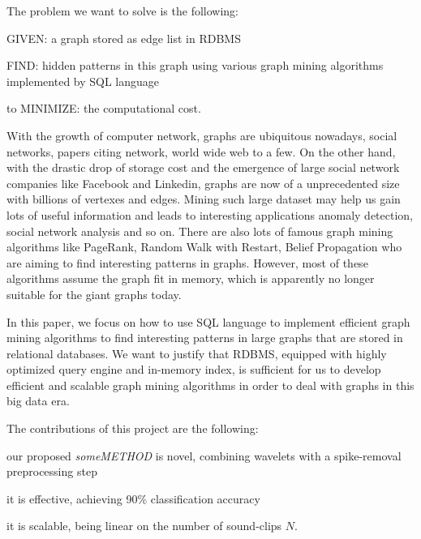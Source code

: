 
The problem we want to solve is the following:
\bit
\item GIVEN: a graph stored as edge list in RDBMS
\item FIND: hidden patterns in this graph using various graph mining algorithms implemented by SQL language
\item to MINIMIZE: the computational cost.
\eit

With the growth of computer network, graphs are ubiquitous nowadays, social networks, papers citing network, world wide web to a few. On the other hand, with the drastic drop of storage cost and the emergence of large social network companies like Facebook and Linkedin, graphs are now of a unprecedented size with billions of vertexes and edges. Mining such large dataset may help us gain lots of useful information and leads to interesting applications anomaly detection, social network analysis and so on. There are also lots of famous graph mining algorithms like PageRank, Random Walk with Restart, Belief Propagation who are aiming to find interesting patterns in graphs. However, most of these algorithms assume the graph fit in memory, which is apparently no longer suitable for the giant graphs today.

In this paper, we focus on how to use SQL language to implement efficient graph mining algorithms to find interesting patterns in large graphs that are stored in relational databases. We want to justify that RDBMS, equipped with highly optimized query engine and in-memory index, is sufficient for us to develop efficient and scalable graph mining algorithms in order to deal with graphs in this big data era.  

The contributions of this project are the following:
\bit
\item our proposed {\em someMETHOD} is novel, combining wavelets
      with a spike-removal  preprocessing step
\item it is effective, achieving 90\% classification accuracy
\item it is scalable, being linear on the number of sound-clips $N$.
\eit
